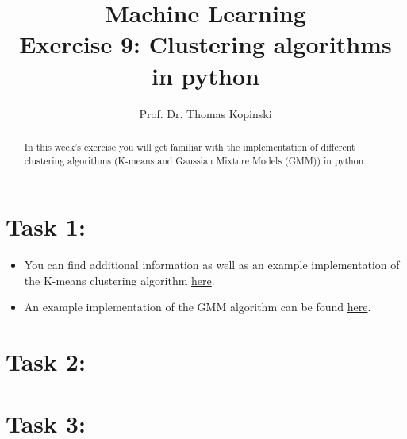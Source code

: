\documentclass{article}
\title{Machine Learning \\ Exercise 9: Clustering algorithms in python}
\author{Prof. Dr. Thomas Kopinski}
\begin{document}
\maketitle

\begin{abstract}
In this week's exercise you will get familiar with the implementation of different clustering algorithms (K-means and Gaussian Mixture Models (GMM)) in python.
\end{abstract}

\section*{Task 1:}

\begin{itemize}
    \item You can find additional information as well as an example implementation of the K-means clustering algorithm  \href{https://github.com/DataScienceLabFHSWF/machine-learning-book/blob/main/notebooks/ch10/ch10.ipynb}{here}.
    \item An example implementation of the GMM algorithm can be found \href{https://www.analyticsvidhya.com/blog/2019/10/gaussian-mixture-models-clustering/}{here}.
\end{itemize}

\section*{Task 2:}

\begin{itemize}
   
\end{itemize}

\section*{Task 3:}

\begin{itemize}
   

\end{itemize}

%
%
\end{document}
